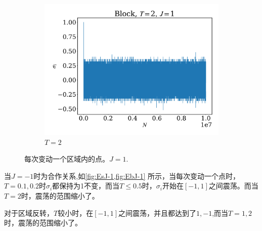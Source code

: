 \documentclass[12pt]{article}
\begin{document}
\begin{figure}
\begin{subfigure}[b]{0.49\textwidth}
		\includegraphics[width=\textwidth]{fig1DJ1N1e7/sig_b_T2J1.pdf}
		\caption{$T=2$}
	\end{subfigure}
	\caption{每次变动一个区域内的点。$J=1$.}
	\label{fig:Eb}
\end{figure}


当$J=-1$时为合作关系,如\cref{fig:EsJ-1,fig:EbJ-1} 所示，当每次变动一个点时，$T=0.1,0.2$时$\sigma_i$都保持为1不变，而当$T\leq 0.5$时，$\sigma_i$开始在$[-1,1]$之间震荡。而当$T=2$时，震荡的范围缩小了。

对于区域反转，$T$较小时，在$[-1,1]$之间震荡，并且都达到了$1,-1$,而当$T=1,2$时，震荡的范围缩小了。
\end{document}
